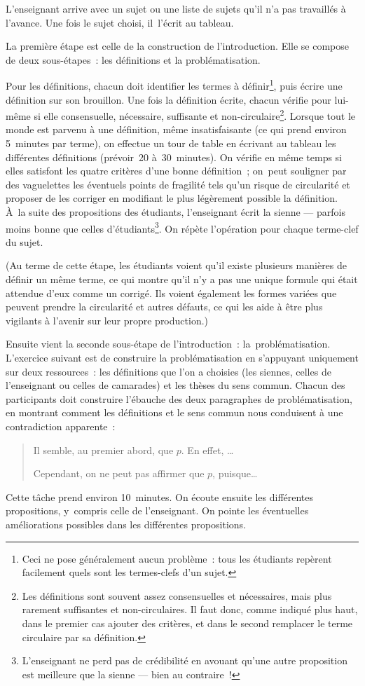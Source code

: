 \documentclass[a4paper,12pt]{report}
\begin{document}
L'enseignant arrive avec un sujet ou une liste de sujets qu'il n'a pas
travaillés à l'avance. Une fois le sujet choisi, il l'écrit au tableau.

La première étape est celle de la construction de l'introduction. Elle
se compose de deux sous-étapes : les définitions et la problématisation. 

Pour les définitions, chacun doit identifier les termes à définir\footnote{Ceci ne pose généralement aucun problème : tous les étudiants
repèrent facilement quels sont les termes-clefs d'un sujet.},
puis écrire une définition sur son brouillon. Une fois la définition
écrite, chacun vérifie pour lui-même si elle consensuelle, nécessaire,
suffisante et non-circulaire\footnote{Les définitions sont souvent assez consensuelles et nécessaires,
mais plus rarement suffisantes et non-circulaires. Il faut donc, comme
indiqué plus haut, dans le premier cas ajouter des critères, et dans le
second remplacer le terme circulaire par sa définition.}. Lorsque tout le monde est parvenu à
une définition, même insatisfaisante (ce qui prend environ 5 minutes par
terme), on effectue un tour de table en écrivant au tableau les
différentes définitions (prévoir 20 à 30 minutes). On vérifie en même
temps si elles satisfont les quatre critères d'une bonne définition ;
on peut souligner par des vaguelettes les éventuels points de fragilité
tels qu'un risque de circularité et proposer de les corriger en
modifiant le plus légèrement possible la définition. À la suite des
propositions des étudiants, l'enseignant écrit la sienne — parfois moins
bonne que celles d'étudiants\footnote{L'enseignant ne perd pas de crédibilité en avouant qu'une autre
proposition est meilleure que la sienne --- bien au contraire !}. On répète l'opération pour chaque
terme-clef du sujet.

(Au terme de cette étape, les étudiants voient qu'il existe plusieurs
manières de définir un même terme, ce qui montre qu'il n'y a pas une
unique formule qui était attendue d'eux comme un corrigé. Ils voient
également les formes variées que peuvent prendre la circularité et
autres défauts, ce qui les aide à être plus vigilants à l'avenir sur
leur propre production.)

Ensuite vient la seconde sous-étape de l'introduction :
la problématisation. L'exercice suivant est de construire la
problématisation en s'appuyant uniquement sur deux ressources : les
définitions que l'on a choisies (les siennes, celles de l'enseignant ou
celles de camarades) et les thèses du sens commun. Chacun des
participants doit construire l'ébauche des deux paragraphes de
problématisation, en montrant comment les définitions et le sens commun
nous conduisent à une contradiction apparente :
\begin{quote}
Il semble, au premier abord, que \(p\). En effet, \ldots{}

Cependant, on ne peut pas affirmer que \(p\), puisque\ldots{}
\end{quote}
Cette tâche prend environ 10 minutes. On écoute ensuite les différentes
propositions, y compris celle de l'enseignant. On pointe les éventuelles
améliorations possibles dans les différentes propositions.
\end{document}
